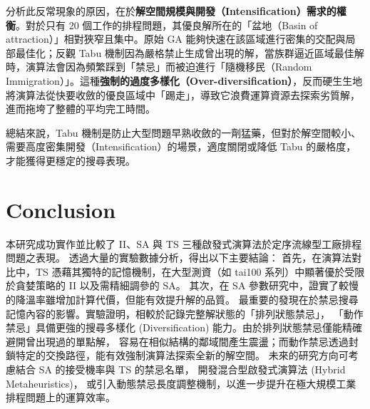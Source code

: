 \documentclass[conference]{IEEEtran}
\begin{document}
分析此反常現象的原因，在於\textbf{解空間規模與開發（Intensification）需求的權衡}。對於只有 20 個工作的排程問題，其優良解所在的「盆地（Basin of attraction）」相對狹窄且集中。原始 GA 能夠快速在該區域進行密集的交配與局部最佳化；反觀 Tabu 機制因為嚴格禁止生成曾出現的解，當族群逼近區域最佳解時，演算法會因為頻繁踩到「禁忌」而被迫進行「隨機移民（Random Immigration）」。這種\textbf{強制的過度多樣化（Over-diversification）}，反而硬生生地將演算法從快要收斂的優良區域中「踢走」，導致它浪費運算資源去探索劣質解，進而拖垮了整體的平均完工時間。

總結來說，Tabu 機制是防止大型問題早熟收斂的一劑猛藥，但對於解空間較小、需要高度密集開發（Intensification）的場景，適度關閉或降低 Tabu 的嚴格度，才能獲得更穩定的搜尋表現。


\clearpage

\section{Conclusion}
本研究成功實作並比較了 II、SA 與 TS 三種啟發式演算法於定序流線型工廠排程問題之表現。
透過大量的實驗數據分析，得出以下主要結論：
首先，在演算法對比中，TS 憑藉其獨特的記憶機制，在大型測資（如 tai100 系列）中顯著優於受限於貪婪策略的 II 以及需精細調參的 SA。
其次，在 SA 參數研究中，證實了較慢的降溫率雖增加計算代價，但能有效提升解的品質。
最重要的發現在於禁忌搜尋記憶內容的影響。實驗證明，相較於記錄完整解狀態的「排列狀態禁忌」，
「動作禁忌」具備更強的搜尋多樣化 (Diversification) 能力。由於排列狀態禁忌僅能精確避開曾出現過的單點解，
容易在相似結構的鄰域間產生震盪；而動作禁忌透過封鎖特定的交換路徑，能有效強制演算法探索全新的解空間。
未來的研究方向可考慮結合 SA 的接受機率與 TS 的禁忌名單，
開發混合型啟發式演算法 (Hybrid Metaheuristics)，
或引入動態禁忌長度調整機制，以進一步提升在極大規模工業排程問題上的運算效率。

\end{document}
